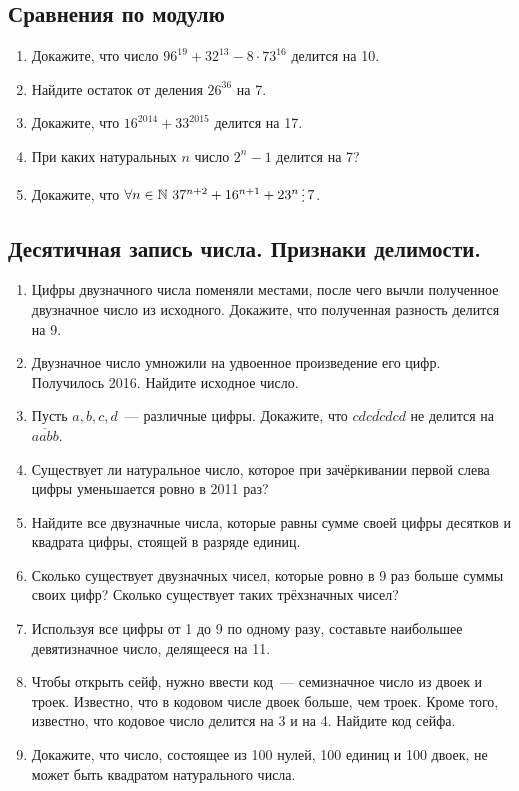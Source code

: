 \documentclass[11pt]{article}
\begin{document}
\subsection{Сравнения по модулю}
    \begin{enumerate}[start=11,label={\bfseries \arabic*.}]
        \item Докажите, что число $96^{19} + 32^{13} - 8 \cdot 73^{16}$ делится на 10.
        \item Найдите остаток от деления $26^{36}$ на 7.

        \item Докажите, что $16^{2014} + 33^{2015}$ делится на 17.

        \item При каких натуральных $n$ число $2^n - 1$ делится на 7?

        \item Докажите, что $\forall n \in \mathbb{N} \ 37^{n + 2} + 16^{n + 1} + 23^{n} \divisible 7$.
    \end{enumerate}
    \subsection{Десятичная запись числа. Признаки делимости.}
    \begin{enumerate}[start=16,label={\bfseries \arabic*.}]
        \item Цифры двузначного числа поменяли местами, после чего вычли полученное двузначное число из исходного. Докажите, что полученная разность делится на 9.

        \item Двузначное число умножили на удвоенное произведение его цифр. Получилось 2016. Найдите исходное число.

        \item Пусть $a, b, c, d$~--- различные цифры. Докажите, что $\overline{cdcdcdcd}$ не делится на $\overline{aabb}$.

        \item Существует ли натуральное число, которое при зачёркивании первой слева цифры уменьшается ровно в 2011 раз?

        \item Найдите все двузначные числа, которые равны сумме своей цифры десятков и квадрата цифры, стоящей в разряде единиц.

        \item Сколько существует двузначных чисел, которые ровно в 9 раз больше суммы своих цифр? Сколько существует таких трёхзначных чисел?

        \item Используя все цифры от 1 до 9 по одному разу, составьте наибольшее девятизначное число, делящееся на 11.

        \item Чтобы открыть сейф, нужно ввести код~--- семизначное число из двоек и троек. Известно, что в кодовом числе двоек больше, чем троек. Кроме того, известно, что кодовое число делится на 3 и на 4. Найдите код сейфа.

        \item Докажите, что число, состоящее из 100 нулей, 100 единиц и 100 двоек, не может быть квадратом натурального числа.
    \end{enumerate}
\end{document}
